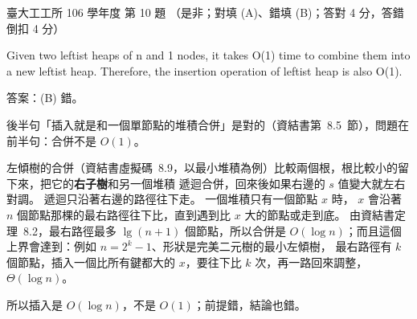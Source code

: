 \begin{pastexam}[label={px:ntu-106-ie-ds-10}]{臺大工工所 106 學年度 第 10 題}
（是非；對填 (A)、錯填 (B)；答對 4 分，答錯倒扣 4 分）

Given two leftist heaps of n and 1 nodes, it takes O(1) time to combine them into a new leftist heap.
Therefore, the insertion operation of leftist heap is also O(1).
\end{pastexam}

\begin{pastsoln}
答案：(B) 錯。

後半句「插入就是和一個單節點的堆積合併」是對的（資結書第~8.5~節），問題在前半句：合併不是 $O(1)$。

左傾樹的合併（資結書虛擬碼~8.9，以最小堆積為例）比較兩個根，根比較小的留下來，把它的\textbf{右子樹}和另一個堆積
遞迴合併，回來後如果右邊的 $s$ 值變大就左右對調。 遞迴只沿著右邊的路徑往下走。 一個堆積只有一個節點 $x$ 時，
$x$ 會沿著 $n$ 個節點那棵的最右路徑往下比，直到遇到比 $x$ 大的節點或走到底。 由資結書定理~8.2，最右路徑最多
$\lg(n+1)$ 個節點，所以合併是 $O(\log n)$；而且這個上界會達到：例如 $n = 2^k - 1$、形狀是完美二元樹的最小左傾樹，
最右路徑有 $k$ 個節點，插入一個比所有鍵都大的 $x$，要往下比 $k$ 次，再一路回來調整，$\Theta(\log n)$。

所以插入是 $O(\log n)$，不是 $O(1)$；前提錯，結論也錯。
\end{pastsoln}
